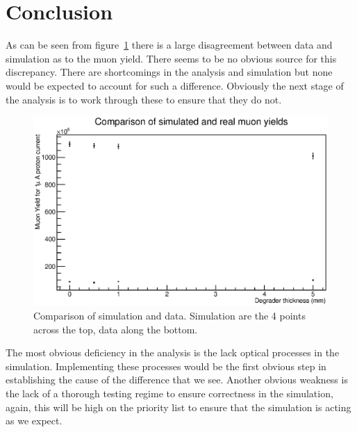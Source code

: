 \documentclass[]{article}
\begin{document}
\section{Conclusion} %
\label{sec:conclusion}
As can be seen from figure~\ref{fig:why_its_buggered} there is a large disagreement between data and simulation as to the muon yield. There seems to be no obvious source for this discrepancy. There are shortcomings in the analysis and simulation but none would be expected to account for such a difference. Obviously the next stage of the analysis is to work through these to ensure that they do not. 
\begin{figure}[htbp]
    \centering
        \includegraphics[width=\textwidth]{image/sim_vs_data.eps}
    \caption{Comparison of simulation and data. Simulation are the 4 points across the top, data along the bottom.}
    \label{fig:why_its_buggered}
\end{figure}

The most obvious deficiency in the analysis is the lack optical processes in the simulation. Implementing these processes would be the first obvious step in establishing the cause of the difference that we see. Another obvious weakness is the lack of a thorough testing regime to ensure correctness in the simulation, again, this will be high on the priority list to ensure that the simulation is acting as we expect. 

\pagebreak
\appendix
\end{document}
